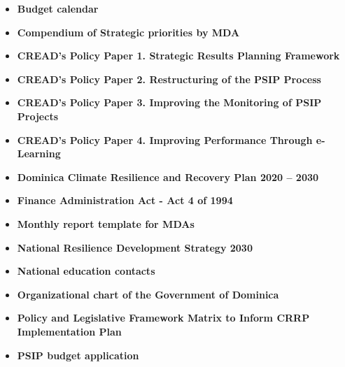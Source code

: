 \documentclass[
  10pt,
]{book}
\begin{document}
\begin{itemize}
\item
  \textbf{Budget calendar}
\item
  \textbf{Compendium of Strategic priorities by MDA}
\item
  \textbf{CREAD's Policy Paper 1. Strategic Results Planning Framework}
\item
  \textbf{CREAD's Policy Paper 2. Restructuring of the PSIP Process}
\item
  \textbf{CREAD's Policy Paper 3. Improving the Monitoring of PSIP Projects}
\item
  \textbf{CREAD's Policy Paper 4. Improving Performance Through e-Learning}
\item
  \textbf{Dominica Climate Resilience and Recovery Plan 2020 -- 2030}
\item
  \textbf{Finance Administration Act - Act 4 of 1994}
\item
  \textbf{Monthly report template for MDAs}
\item
  \textbf{National Resilience Development Strategy 2030}
\item
  \textbf{National education contacts}
\item
  \textbf{Organizational chart of the Government of Dominica}
\item
  \textbf{Policy and Legislative Framework Matrix to Inform CRRP Implementation Plan}
\item
  \textbf{PSIP budget application}
\end{itemize}

  
\end{document}
